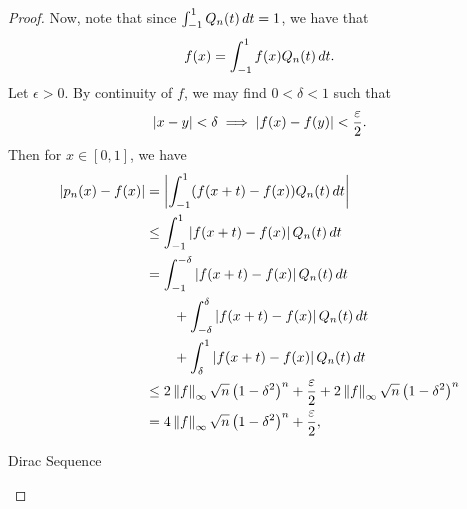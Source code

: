 \documentclass[notoc,notitlepage]{tufte-book}
\newcommand{\norm}[1]{\left\| #1 \right\|}
\begin{document}
\begin{proof}
  Now, note that since $\int_{-1}^{1} Q_n(t) \mathop{}\!d{t} = 1$, we have that
  \begin{equation*}
    f(x) = \int_{-1}^{1} f(x) Q_n(t) \mathop{}\!d{t}.
  \end{equation*}
  Let $\epsilon > 0$. By continuity of $f$, we may find $0 < \delta < 1$ such that
  \begin{equation*}
    \left| x - y \right| < \delta \implies \left| f(x) - f(y) \right| < \frac{\varepsilon}{2}.
  \end{equation*}
  Then for $x \in [0, 1]$, we have
  \begin{align}
    \abs{ p_n(x) - f(x) } &= \abs{ \int_{-1}^{1} ( f(x + t) - f(x) ) Q_n(t) \dif{t} } \nonumber \\
                          &\leq \int_{-1}^{1} \abs{ f(x + t) - f(x) } Q_n(t) \dif{t} \nonumber \\
                          &= \int_{-1}^{-\delta} \abs{ f(x + t) - f(x) } Q_n(t) \dif{t} \nonumber \\
                          &\qquad + \int_{-\delta}^{\delta} \abs{ f(x + t) - f(x) } Q_n(t) \dif{t} \nonumber \\
                          &\qquad + \int_{\delta}^{1} \abs{ f(x + t) - f(x) } Q_n(t) \dif{t} \nonumber \\
                          &\leq 2 \norm{f}_\infty \sqrt{n} \left( 1 - \delta^2 \right)^n + \frac{\epsilon}{2} + 2 \norm{f}_\infty \sqrt{n} \left( 1 - \delta^2 \right)^n \label{eq:weierstrass_approx_eq1} \\
                          &= 4 \norm{f}_\infty \sqrt{n} \left( 1 - \delta^2 \right)^n + \frac{\epsilon}{2}, \nonumber
  \end{align}
  \begin{marginfigure}
    \centering
    \caption{Dirac Sequence}\label{fig:dirac_sequence}
  \end{marginfigure}
  \begin{marginfigure}
    \centering
\end{marginfigure}
\end{proof}
\end{document}
